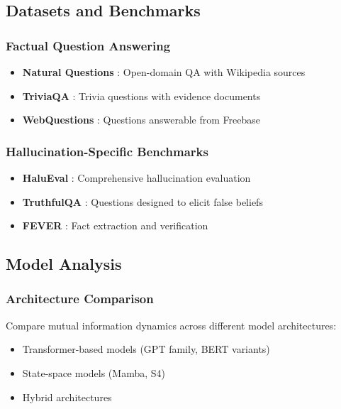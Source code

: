 \subsection{Datasets and Benchmarks}
\label{subsec:datasets}

\subsubsection{Factual Question Answering}
\begin{itemize}
    \item \textbf{Natural Questions} \citep{kwiatkowski2019natural}: Open-domain QA with Wikipedia sources
    \item \textbf{TriviaQA} \citep{joshi2017triviaqa}: Trivia questions with evidence documents
    \item \textbf{WebQuestions} \citep{berant2013semantic}: Questions answerable from Freebase
\end{itemize}

\subsubsection{Hallucination-Specific Benchmarks}
\begin{itemize}
    \item \textbf{HaluEval} \citep{li2023halueval}: Comprehensive hallucination evaluation
    \item \textbf{TruthfulQA} \citep{lin2021truthfulqa}: Questions designed to elicit false beliefs
    \item \textbf{FEVER} \citep{thorne2018fever}: Fact extraction and verification
\end{itemize}

\subsection{Model Analysis}
\label{subsec:model_analysis}

\subsubsection{Architecture Comparison}
Compare mutual information dynamics across different model architectures:
\begin{itemize}
    \item Transformer-based models (GPT family, BERT variants)
    \item State-space models (Mamba, S4)
    \item Hybrid architectures
\end{itemize}


